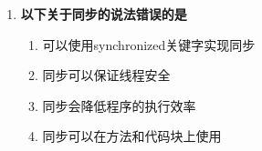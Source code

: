 \documentclass[12pt, a4paper]{ctexart}
\begin{document}
\begin{enumerate}[label=\textbf{\arabic*.}]
\begin{bluebox}{答案与深度解析}
\begin{itemize}[label={}, leftmargin=*, nosep]
		      \item \textbf{D. yield() — 错误（让步）}
		      \begin{itemize}[label={}, leftmargin=*, nosep]
			      \item \textbf{作用}：提示调度器让出CPU时间片
			            \begin{lstlisting}[language=Java]
Thread.yield(); // 暂停当前线程，允许其他线程执行
      \end{lstlisting}
			      \item \textbf{注意}：yield()不确定一定让出，只是建议
		      \end{itemize}

		      \end{itemize}

		      \textbf{【应背诵知识点（命题人思维版）】}
		      \begin{enumerate}[label={}, leftmargin=*, nosep]
			      \item \textbf{start() vs run()}：
			            \begin{itemize}[label={}, nosep]
				            \item start()：创建新线程，异步执行
				            \item run()：同步执行，不创建新线程
			            \end{itemize}

			      \item \textbf{高频陷阱清单}：
			            \begin{itemize}[label={}, nosep]
				            \item 陷阱1：调用run()不会启动新线程
				            \item 陷阱2：start()只能调用一次，多次调用抛IllegalThreadStateException
			            \end{itemize}
		      \end{enumerate}

		      \textbf{【命题趋势与实战策略】}

		      \textbf{考场秒杀技巧}：记启动用start()，执行用run()
	      \end{bluebox}

	\item \textbf{以下关于同步的说法错误的是}
	      \begin{enumerate}[label=\Alph*.]
		      \item 可以使用synchronized关键字实现同步
		      \item 同步可以保证线程安全
		      \item 同步会降低程序的执行效率
		      \item 同步可以在方法和代码块上使用
	      \end{enumerate}


\end{enumerate}
\end{document}
